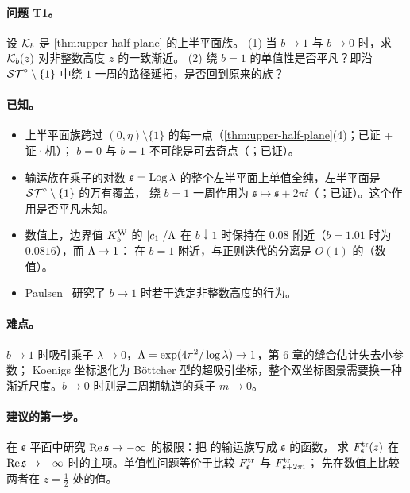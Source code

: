 \paragraph{问题 T1。}设 $\mathcal K_b$ 是 \cref{thm:upper-half-plane} 的上半平面族。
(1) 当 $b\to1$ 与 $b\to0$ 时，求 $\mathcal K_b(z)$ 对非整数高度 $z$ 的一致渐近。
(2) 绕 $b=1$ 的单值性是否平凡？即沿 $\mathcal{ST}^\circ\setminus\{1\}$ 中绕 $1$ 一周的路径延拓，是否回到原来的族？

\paragraph{已知。}
\begin{itemize}
\item 上半平面族跨过 $(0,\eta)\setminus\{1\}$ 的每一点（\cref{thm:upper-half-plane}(4)；已证 + 证·机）；
  $b=0$ 与 $b=1$ 不可能是可去奇点（\cite[命题~10.46]{KneserPaper}；已证）。
\item 输运族在乘子的对数 $\mathfrak s=\operatorname{Log}\lambda$ 的整个左半平面上单值全纯，左半平面是 $\mathcal{ST}^\circ\setminus\{1\}$ 的万有覆盖，
  绕 $b=1$ 一周作用为 $\mathfrak s\mapsto\mathfrak s+2\pi\ii$（\cite[注~10.24]{KneserPaper}；已证）。这个作用是否平凡未知。
\item 数值上，边界值 $K^{\mathrm W}_b$ 的 $|c_1|/\Lambda$ 在 $b\downarrow1$ 时保持在 $0.08$ 附近（$b=1.01$ 时为 $0.0816$），而 $\Lambda\to1$：
  在 $b=1$ 附近，与正则迭代的分离是 $O(1)$ 的（数值）。
\item Paulsen~\cite{Paulsen2026} 研究了 $b\to1$ 时若干选定非整数高度的行为。
\end{itemize}

\paragraph{难点。}$b\to1$ 时吸引乘子 $\lambda\to0$，$\Lambda=\exp(4\pi^2/\log\lambda)\to1$，第 6 章的缝合估计失去小参数；
Koenigs 坐标退化为 Böttcher 型的超吸引坐标，整个双坐标图景需要换一种渐近尺度。$b\to0$ 时则是二周期轨道的乘子 $m\to0$。

\paragraph{建议的第一步。}在 $\mathfrak s$ 平面中研究 $\operatorname{Re}\mathfrak s\to-\infty$ 的极限：把 \cite[第~10.9~节]{KneserPaper} 的输运族写成 $\mathfrak s$ 的函数，
求 $F^{\mathrm{tr}}_{\mathfrak s}(z)$ 在 $\operatorname{Re}\mathfrak s\to-\infty$ 时的主项。单值性问题等价于比较 $F^{\mathrm{tr}}_{\mathfrak s}$ 与 $F^{\mathrm{tr}}_{\mathfrak s+2\pi\mathrm{i}}$；
先在数值上比较两者在 $z=\tfrac12$ 处的值。


